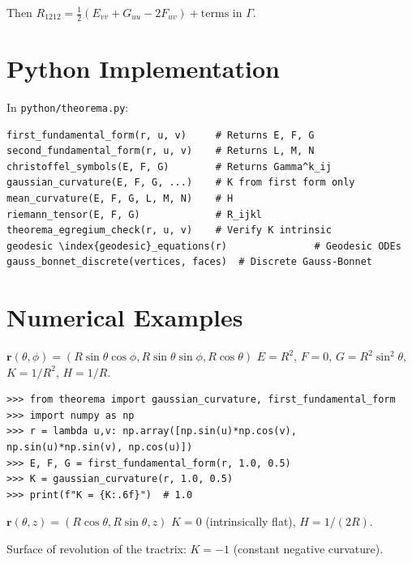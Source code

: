 Then $R_{1212} = \frac{1}{2}(E_{vv} + G_{uu} - 2F_{uv}) + \text{terms in } \Gamma$.

\section{Python Implementation}

In \texttt{python/theorema.py}:

\begin{lstlisting}[style=python, caption={Key functions in python/theorema.py}]
first_fundamental_form(r, u, v)     # Returns E, F, G
second_fundamental_form(r, u, v)    # Returns L, M, N
christoffel_symbols(E, F, G)        # Returns Gamma^k_ij
gaussian_curvature(E, F, G, ...)    # K from first form only
mean_curvature(E, F, G, L, M, N)    # H
riemann_tensor(E, F, G)             # R_ijkl
theorema_egregium_check(r, u, v)    # Verify K intrinsic
geodesic \index{geodesic}_equations(r)               # Geodesic ODEs
gauss_bonnet_discrete(vertices, faces)  # Discrete Gauss-Bonnet
\end{lstlisting}

\section{Numerical Examples}

\begin{example}
$\mathbf{r}(\theta,\phi) = (R\sin\theta\cos\phi, R\sin\theta\sin\phi, R\cos\theta)$
$E = R^2$, $F = 0$, $G = R^2\sin^2\theta$, $K = 1/R^2$, $H = 1/R$.
\begin{lstlisting}[style=python]
>>> from theorema import gaussian_curvature, first_fundamental_form
>>> import numpy as np
>>> r = lambda u,v: np.array([np.sin(u)*np.cos(v), np.sin(u)*np.sin(v), np.cos(u)])
>>> E, F, G = first_fundamental_form(r, 1.0, 0.5)
>>> K = gaussian_curvature(r, 1.0, 0.5)
>>> print(f"K = {K:.6f}")  # 1.0
\end{lstlisting}
\end{example}

\begin{example}[Cylinder]
$\mathbf{r}(\theta,z) = (R\cos\theta, R\sin\theta, z)$
$K = 0$ (intrinsically flat), $H = 1/(2R)$.
\end{example}

\begin{example}[Pseudosphere]
Surface of revolution of the tractrix: $K = -1$ (constant negative curvature).
\end{example}

